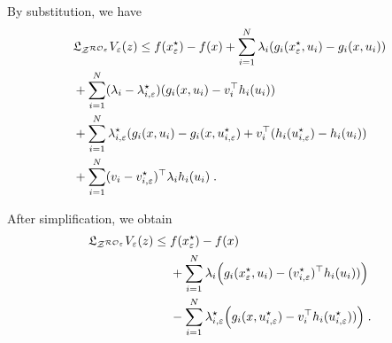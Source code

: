 \documentclass[journal,twoside,web]{ieeecolor}
\begin{document}
By substitution, we have
\begin{align}
&\mathfrak{L}_{{\cal Z}^{{\cal RO}_\varepsilon}}V_\varepsilon(z) \leq f(x_\varepsilon^\star)-f(x)+\sum_{i=1}^N\lambda_i (g_i(x_\varepsilon^\star,u_i)-g_i(x,u_i))\nonumber\\
&+\sum_{i=1}^N(\lambda_i-\lambda_{i,\varepsilon}^\star)(g_i(x,u_i)-v_i^\top h_i(u_i))\nonumber\\
&+\sum_{i=1}^N \lambda_{i,\varepsilon}^\star (g_i(x,u_i)-g_i(x,u_{i,\varepsilon}^\star)+v_i^\top (h_i(u_{i,\varepsilon}^\star)-h_i(u_i))\nonumber\\
&+\sum_{i=1}^N (v_{i}-v_{i,\varepsilon}^\star)^\top\lambda_i h_{i}(u_i)\;. \label{vdot_first}
\end{align}

After simplification, we obtain
\begin{align*}
\mathfrak{L}_{{\cal Z}^{{\cal RO}_\varepsilon}}V_\varepsilon(z) \leq \; &f(x_\varepsilon^\star)-f(x)\\
&+\sum_{i=1}^N\lambda_i \Big(g_i(x_\varepsilon^\star,u_i)-(v_{i,\varepsilon}^\star)^\top h_i(u_i))\Big)\\
&-\sum_{i=1}^N\lambda_{i,\varepsilon}^\star \Big(g_i(x,u_{i,\varepsilon}^\star)-v_i^\top h_i(u_{i,\varepsilon}^\star))\Big)\;.
\end{align*}
\end{document}
